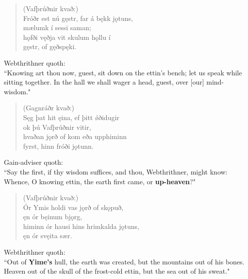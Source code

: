 \begin{verse}
(Vafþrúðnir kvað:) \\%
\bva Fróðr est nú gęstr, \hld far á bękk jǫtuns, \\%
\ind mælumk í sessi saman; \\%
hǫfði vęðja \hld vit skulum hǫllu í \\%
\ind gęstr, of gęðspęki.\\%
\end{verse}

\bvb Webthrithner quoth: \\ “Knowing art thou now, guest, sit down on the ettin's bench; let us speak while sitting together. In the hall we shall wager a head, guest, over [our] mind-wisdom." \\

\begin{verse}
(Gagnráðr kvað:) \\%
\bva Sęg þat hit ęina, \hld ef þitt ǿði\footnotemark[10] dugir \\%
\ind ok þú Vafþrúðnir vitir, \\%
hvaðan jǫrð of kom \hld eða upphiminn \\%
\ind fyrst, hinn fróði jǫtunn.\\%
\end{verse}

\bvb Gain-adviser quoth: \\ “Say the first\footnotemark[32], if thy wisdom suffices, and thou, Webthrithner, might know: Whence, O knowing ettin, the earth first came, or \textbf{up-heaven}?" \\

\begin{verse}
(Vafþrúðnir kvað:) \\%
\bva Ór Ymis holdi \hld vas jǫrð of skǫpuð, \\%
\ind ęn ór bęinum bjǫrg, \\%
himinn ór hausi \hld hins hrimkalda jǫtuns, \\%
\ind ęn ór svęita sær.\\%
\end{verse}

\bvb Webthrithner quoth: \\ “Out of \textbf{Yime's} hull\footnotemark[35], the earth was created, but the mountains out of his bones. Heaven out of the skull of the frost-cold ettin, but the sea out of his sweat.\footnotemark[36]" \\


